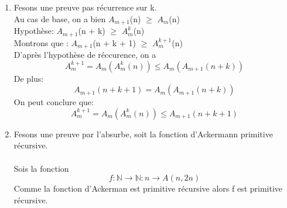 \documentclass{article}
\begin{document}
\begin{enumerate}
\begin{enumerate}
\item Fesons une preuve pas récurrence sur k.\\
Au cas de base, on a bien $A_{m+1}$\normalsize (n) $\ge$ $A_m$\normalsize (n)\\
Hypothèse: $A_{m+1}$\normalsize (n + k) $\ge$ $A^k_m$\normalsize (n)\\
Montrons que : $A_{m+1}$(n + k + 1) $\ge$ $A^{k+1}_m$(n)\\
D'après l'hypothèse de réccurence, on a \\
\[A^{k+1}_m = A_m(A^k_m(n)) \le A_m(A_{m+1}(n + k))\] 
De plus:\\
\[A_{m+1}(n + k + 1) = A_m(A_{m+1}(n + k))\]
On peut conclure que:\\
\[A^{k+1}_m = A_m(A^k_m(n)) \le A_{m+1}(n + k + 1)\]
\item 
Fesons une preuve par l'absurbe, soit la fonction d'Ackermann primitive récursive.\\\\
Sois la fonction \[f: \mathbb{N} \rightarrow \mathbb{N} : n \rightarrow A(n,2n)\]
Comme la fonction d'Ackerman est primitive récursive alors f est primitive récursive.   
\end{enumerate}
\end{enumerate}
\end{document}
